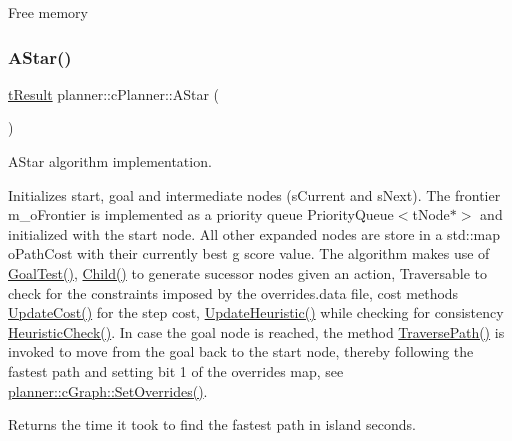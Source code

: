 Free memory \mbox{\label{classplanner_1_1c_planner_a341e70531266f023ac9461d18979d1ef}} 
\subsubsection{\texorpdfstring{A\+Star()}{AStar()}\hspace{0.1cm}{\footnotesize\ttfamily [2/2]}}
{\footnotesize\ttfamily \mbox{\hyperlink{structt_result}{t\+Result}} planner\+::c\+Planner\+::\+A\+Star (\begin{DoxyParamCaption}{ }\end{DoxyParamCaption})\hspace{0.3cm}{\ttfamily [protected]}}



A\+Star algorithm implementation. 

Initializes start, goal and intermediate nodes (s\+Current and s\+Next). The frontier m\+\_\+o\+Frontier is implemented as a priority queue Priority\+Queue$<$t\+Node$\ast$$>$ and initialized with the start node. All other expanded nodes are store in a std\+::map o\+Path\+Cost with their currently best g score value. The algorithm makes use of \mbox{\hyperlink{classplanner_1_1c_planner_a6b7554394efd7ad10d76a49b370aa62f}{Goal\+Test()}}, \mbox{\hyperlink{classplanner_1_1c_planner_adbffc6ce05119c940a09369d7e61554e}{Child()}} to generate sucessor nodes given an action, Traversable to check for the constraints imposed by the overrides.\+data file, cost methods \mbox{\hyperlink{classplanner_1_1c_planner_a16e8c156297fff49a6ba9b97073baffb}{Update\+Cost()}} for the step cost, \mbox{\hyperlink{classplanner_1_1c_planner_ab7cc7c2666de2e49f745901080aac147}{Update\+Heuristic()}} while checking for consistency \mbox{\hyperlink{classplanner_1_1c_planner_a1234d075676fcaa2c17b859d11b4638c}{Heuristic\+Check()}}. In case the goal node is reached, the method \mbox{\hyperlink{classplanner_1_1c_planner_a8624cb2afb8f2fd216c38b4424013178}{Traverse\+Path()}} is invoked to move from the goal back to the start node, thereby following the fastest path and setting bit 1 of the overrides map, see \mbox{\hyperlink{classplanner_1_1c_graph_a6da6e6e269013628aef48245a7787cb9}{planner\+::c\+Graph\+::\+Set\+Overrides()}}. \begin{DoxyReturn}{Returns}
the time it took to find the fastest path in island seconds. 
\end{DoxyReturn}
\mbox{\label{classplanner_1_1c_planner_a2e5a745f83f903662eff914d8beddb5e}} 
